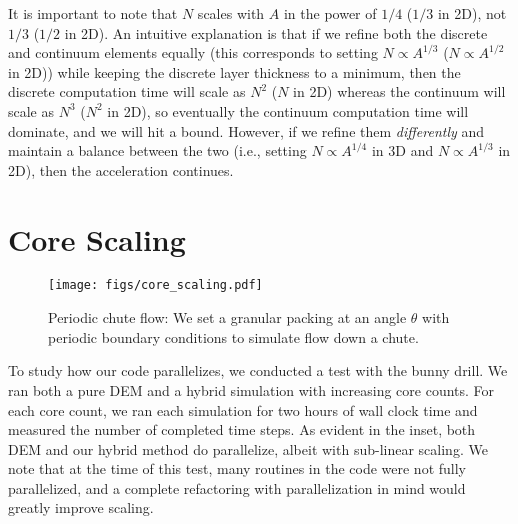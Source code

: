 It is important to note that $N$ scales with $A$ in the power of $1/4$ ($1/3$ in 2D), not $1/3$ ($1/2$ in 2D).
An intuitive explanation is that if we refine both the discrete and continuum elements equally (this corresponds to setting $N \propto A^{1/3}$ ($N \propto A^{1/2}$ in 2D)) while keeping the discrete layer thickness to a minimum,
then the discrete computation time will scale as $N^2$ ($N$ in 2D) whereas the
continuum will scale as $N^3$ ($N^2$ in 2D), so eventually the continuum computation time will dominate, and we
will hit a bound. However, if we refine them \textit{differently} and maintain a balance between the two (i.e., setting $N \propto A^{1/4}$ in 3D and $N \propto A^{1/3}$ in 2D),
then the acceleration continues.

\section{Core Scaling}
\begin{figure}
  \centering
  \texttt{[image: figs/core\_scaling.pdf]}
  \caption{
    Periodic chute flow: We set a granular packing at an angle $\theta$ with periodic boundary conditions to simulate flow down a chute.
  }
  \label{fig:hybrid:chute_flow}
\end{figure}

To study how our code parallelizes, we conducted a test with the bunny drill. We ran both a pure DEM and a hybrid simulation with increasing core counts. For each core count, we ran each simulation for two hours of wall clock time and measured the number of completed time steps. As evident in the inset, both DEM and our hybrid method do parallelize, albeit with sub-linear scaling. We note that at the time of this test, many routines in the code were not fully parallelized, and a complete refactoring with parallelization in mind would greatly improve scaling.


